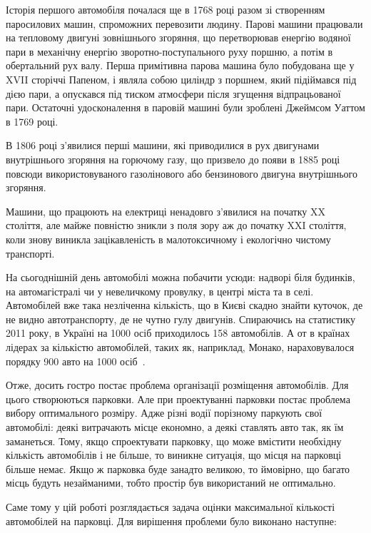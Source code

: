 
Історія першого автомобіля почалася ще в 1768 році разом зі створенням паросилових машин, спроможних перевозити людину. Парові машини працювали на тепловому двигуні зовнішнього згоряння, що перетворював енергію водяної пари в механічну енергію зворотно-поступального руху поршню, а потім в обертальний рух валу. Перша примітивна парова машина було побудована ще у XVII сторіччі Папеном, і являла собою циліндр з поршнем, який підіймався під дією пари, а опускався під тиском атмосфери після згущення відпрацьованої пари. Остаточні удосконалення в паровій машині були зроблені Джеймсом Уаттом в 1769 році.

В 1806 році з’явилися перші машини, які приводилися в рух двигунами внутрішнього згоряння на горючому газу, що призвело до появи в 1885 році повсюди використовуваного газолінового або бензинового двигуна внутрішнього згоряння.

Машини, що працюють на електриці ненадовго з’явилися на початку XX століття, але майже повністю зникли з поля зору аж до початку XXI століття, коли знову виникла зацікавленість в малотоксичному і екологічно чистому транспорті.

На сьогоднішній день автомобілі можна побачити усюди: надворі біля будинків, на автомагістралі чи у невеличкому провулку, в центрі міста та в селі. Автомобілей вже така незліченна кількість, що в Києві скадно знайти куточок, де не видно автотранспорту, де не чутно гулу двигунів.
Спираючись на статистику 2011 року, в Україні на 1000 осіб приходилось 158 автомобілів. А от в країнах лідерах за кількістю автомобілей, таких як, наприклад, Монако, нараховувалося порядку 900 авто на 1000 осіб~\cite{CarsRatingWiki}.

Отже, досить гостро постає проблема організації розміщення автомобілів. Для цього створюються парковки. Але при проектуванні парковки постає проблема вибору оптимального розміру. Адже різні водії порізному паркують свої автомобілі: деякі витрачають місце економно, а деякі ставлять авто так, як їм заманеться. Тому, якщо спроектувати парковку, що може вмістити необхідну кількість автомобілів і не більше, то виникне ситуація, що місця на парковці більше немає. Якщо ж парковка буде занадто великою, то ймовірно, що багато місць будуть незайманими, тобто простір був використаний не оптимально.

Саме тому у цій роботі розглядається задача оцінки максимальної кількості автомобілей на парковці. Для вирішення проблеми було виконано наступне:

